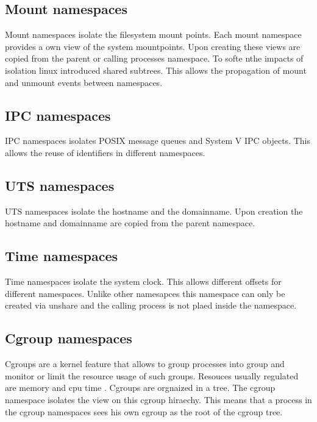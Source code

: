 \documentclass[10pt,twocolumn,a4paper]{article}
\begin{document}
\subsection{Mount namespaces}
Mount namespaces isolate the filesystem mount points. 
Each mount namespace provides a own view of the system mountpoints. 
Upon creating these views are copied from the parent or calling processes namespace.
To softe nthe impacts of isolation linux introduced shared subtrees. This allows the propagation of
mount and unmount events between namespaces.\cite{12}

\subsection{IPC namespaces}
IPC namespaces isolates POSIX message queues and System V IPC objects. This allows the reuse of identifiers
in different namespaces.\cite{13}

\subsection{UTS namespaces}
UTS namespaces isolate the hostname and the domainname. Upon creation the hostname and domainname are copied from the parent namespace.\cite{14}

\subsection{Time namespaces}
Time namespaces isolate the system clock. This allows different offsets for different namespaces.
Unlike other namesapces this namespace can only be created via unshare and  the calling process is
not plaed inside the namespace.\cite{15}

\subsection{Cgroup namespaces}
Cgroups are a kernel feature that allows to group processes into group and monitor or limit the resource usage
of such groups. Resouces usually regulated are memory and cpu time \cite{16}. Cgroups are orgnaized
in a tree. The cgroup namespace isolates the view on this cgroup hiraechy. This means that a process
in the cgroup namespaces sees his own cgroup as the root of the cgroup tree. \cite{17}
\end{document}
